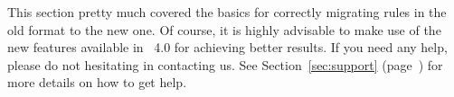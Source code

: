 This section pretty much covered the basics for correctly migrating rules in the old format to the new one. Of course, it is highly advisable to make use of the new features available in \arara\ 4.0 for achieving better results. If you need any help, please do not hesitating in contacting us. See Section~\ref{sec:support} (page~\pageref{sec:support}) for more details on how to get help.